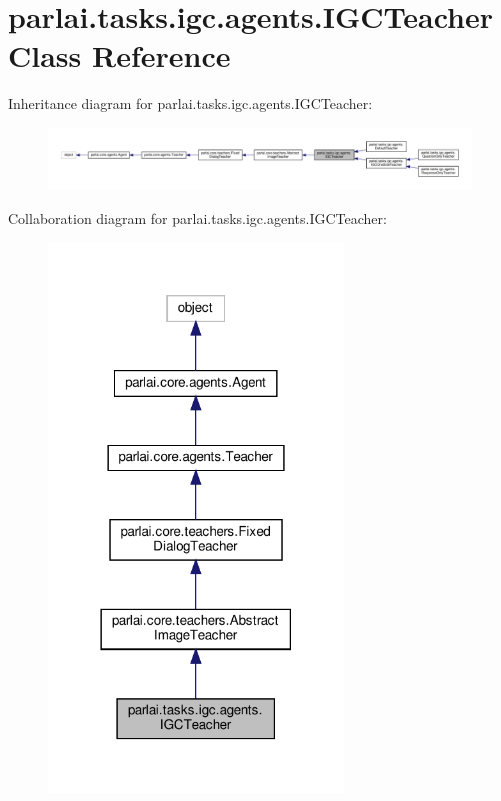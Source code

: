 \hypertarget{classparlai_1_1tasks_1_1igc_1_1agents_1_1IGCTeacher}{}\section{parlai.\+tasks.\+igc.\+agents.\+I\+G\+C\+Teacher Class Reference}
\label{classparlai_1_1tasks_1_1igc_1_1agents_1_1IGCTeacher}


Inheritance diagram for parlai.\+tasks.\+igc.\+agents.\+I\+G\+C\+Teacher\+:
\nopagebreak
\begin{figure}[H]
\begin{center}
\leavevmode
\includegraphics[width=350pt]{d8/dd4/classparlai_1_1tasks_1_1igc_1_1agents_1_1IGCTeacher__inherit__graph}
\end{center}
\end{figure}


Collaboration diagram for parlai.\+tasks.\+igc.\+agents.\+I\+G\+C\+Teacher\+:
\nopagebreak
\begin{figure}[H]
\begin{center}
\leavevmode
\includegraphics[width=222pt]{dd/dc1/classparlai_1_1tasks_1_1igc_1_1agents_1_1IGCTeacher__coll__graph}
\end{center}
\end{figure}
